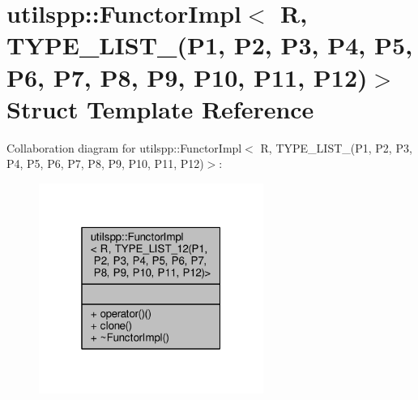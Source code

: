 \hypertarget{structutilspp_1_1FunctorImpl_3_01R_00_01TYPE__LIST__12_07P1_00_01P2_00_01P3_00_01P4_00_01P5_00_0f8d0c7f7e384c45bf768264cb987d1dc}{\section{utilspp\-:\-:Functor\-Impl$<$ R, T\-Y\-P\-E\-\_\-\-L\-I\-S\-T\-\_(P1, P2, P3, P4, P5, P6, P7, P8, P9, P10, P11, P12)$>$ Struct Template Reference}
\label{structutilspp_1_1FunctorImpl_3_01R_00_01TYPE__LIST__12_07P1_00_01P2_00_01P3_00_01P4_00_01P5_00_0f8d0c7f7e384c45bf768264cb987d1dc}
}


Collaboration diagram for utilspp\-:\-:Functor\-Impl$<$ R, T\-Y\-P\-E\-\_\-\-L\-I\-S\-T\-\_(P1, P2, P3, P4, P5, P6, P7, P8, P9, P10, P11, P12)$>$\-:
\nopagebreak
\begin{figure}[H]
\begin{center}
\leavevmode
\includegraphics[width=208pt]{structutilspp_1_1FunctorImpl_3_01R_00_01TYPE__LIST__12_07P1_00_01P2_00_01P3_00_01P4_00_01P5_00_01fda986fbaa63d8271f174d79261ea4b}
\end{center}
\end{figure}
